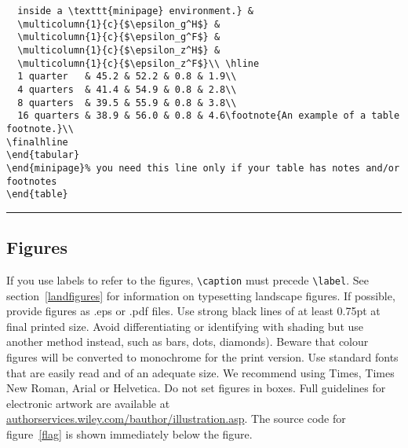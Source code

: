\documentclass{cje}          %
\theoremstyle{plain}%
\theoremstyle{definition}
\theoremstyle{remark}
\begin{document}
\begin{table}
\begin{verbatim}
  inside a \texttt{minipage} environment.} & 
  \multicolumn{1}{c}{$\epsilon_g^H$} & 
  \multicolumn{1}{c}{$\epsilon_g^F$} & 
  \multicolumn{1}{c}{$\epsilon_z^H$} & 
  \multicolumn{1}{c}{$\epsilon_z^F$}\\ \hline
  1 quarter   & 45.2 & 52.2 & 0.8 & 1.9\\
  4 quarters  & 41.4 & 54.9 & 0.8 & 2.8\\
  8 quarters  & 39.5 & 55.9 & 0.8 & 3.8\\
  16 quarters & 38.9 & 56.0 & 0.8 & 4.6\footnote{An example of a table footnote.}\\
\finalhline
\end{tabular}
\end{minipage}% you need this line only if your table has notes and/or footnotes
\end{table}
\end{verbatim}
%
\vspace\baselineskip\hrule %
\end{table}

\subsection{Figures}

If you use labels to refer to the figures, \verb"\caption" must precede \verb"\label". See section~\ref{landfigures} for information on typesetting landscape figures. If possible, provide figures as .eps or .pdf files. Use strong black lines of at least 0.75pt at final printed size. Avoid differentiating or identifying with shading but use another method instead, such as bars, dots, diamonds). Beware that colour figures will be converted to monochrome for the print  version. Use standard fonts that are easily read and of an adequate size. We recommend using Times, Times New Roman, Arial or Helvetica. Do not set figures in boxes. Full guidelines for electronic artwork are available at \href{http://authorservices.wiley.com/author-resources/Journal-Authors/Prepare/manuscript-preparation-guidelines.html}{authorservices.wiley.com/bauthor/illustration.asp}. The source code for figure~\ref{flag} is shown immediately below the figure.
\end{document}
